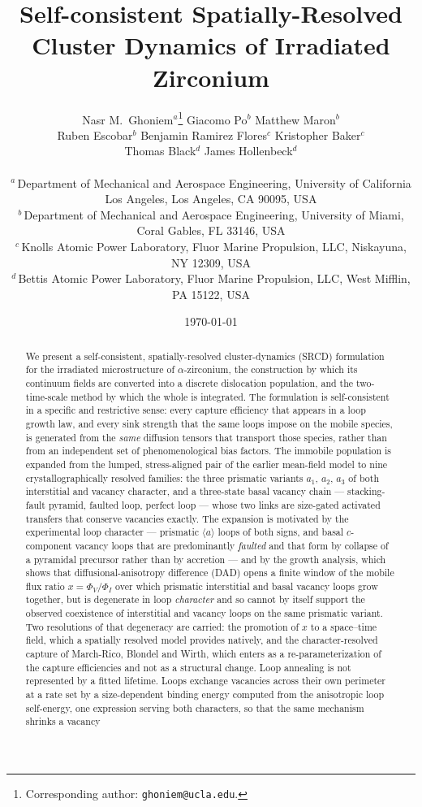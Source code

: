 \documentclass{article}
\title{\bfseries Self-consistent Spatially-Resolved Cluster Dynamics of
       Irradiated Zirconium}
\author{%
  \normalsize
  Nasr M.\ Ghoniem$^{a}$\thanks{Corresponding author: \texttt{ghoniem@ucla.edu}.}
  \quad Giacomo Po$^{b}$
  \quad Matthew Maron$^{b}$\\[3pt]
  \quad Ruben Escobar$^{b}$
  \quad Benjamin Ramirez Flores$^{c}$
  \quad Kristopher Baker$^{c}$\\[3pt]
  Thomas Black$^{d}$
  \quad James Hollenbeck$^{d}$\\[8pt]
  \begin{minipage}{0.9\textwidth}\centering\footnotesize
    $^{a}$\,Department of Mechanical and Aerospace Engineering,
    University of California Los Angeles, Los Angeles, CA 90095, USA\\
    $^{b}$\,Department of Mechanical and Aerospace Engineering,
    University of Miami, Coral Gables, FL 33146, USA\\
    $^{c}$\,Knolls Atomic Power Laboratory, Fluor Marine Propulsion, LLC,
    Niskayuna, NY 12309, USA\\
    $^{d}$\,Bettis Atomic Power Laboratory, Fluor Marine Propulsion, LLC,
    West Mifflin, PA 15122, USA
  \end{minipage}
}
\date{\today}
\newcommand{\aloop}{\ensuremath{\langle a\rangle}}
\begin{document}
\maketitle

\begin{abstract}
We present a self-consistent, spatially-resolved cluster-dynamics (SRCD)
formulation for the irradiated microstructure of $\alpha$-zirconium, the
construction by which its continuum fields are converted into a discrete
dislocation population, and the two-time-scale method by which the whole is
integrated. The formulation is self-consistent in a specific and restrictive
sense: every capture efficiency that appears in a loop growth law, and every sink
strength that the same loops impose on the mobile species, is generated from the
\emph{same} diffusion tensors that transport those species, rather than from an
independent set of phenomenological bias factors. The immobile population is
expanded from the lumped, stress-aligned pair of the earlier mean-field model to
nine crystallographically resolved families: the three prismatic variants $a_1$,
$a_2$, $a_3$ of both interstitial and vacancy character, and a three-state basal
vacancy chain --- stacking-fault pyramid, faulted loop, perfect loop --- whose two
links are size-gated activated transfers that conserve vacancies exactly. The
expansion is motivated by the experimental loop character --- prismatic \aloop{}
loops of both signs, and basal $c$-component vacancy loops that are predominantly
\emph{faulted} and that form by collapse of a pyramidal precursor rather than by
accretion --- and by the growth analysis, which shows that diffusional-anisotropy
difference (DAD) opens a finite window of the mobile flux ratio
$x=\Phi_V/\Phi_I$ over which prismatic interstitial and basal vacancy loops grow
together, but is degenerate in loop \emph{character} and so cannot by itself
support the observed coexistence of interstitial and vacancy loops on the same
prismatic variant. Two resolutions of that degeneracy are carried: the promotion
of $x$ to a space--time field, which a spatially resolved model provides
natively, and the character-resolved capture of March-Rico, Blondel and Wirth,
which enters as a re-parameterization of the capture efficiencies and not as a
structural change. Loop annealing is not represented by a fitted lifetime.
Loops exchange vacancies across their own perimeter at a rate set by a
size-dependent binding energy computed from the anisotropic loop self-energy, one
expression serving both characters, so that the same mechanism shrinks a vacancy

\end{abstract}
\end{document}
